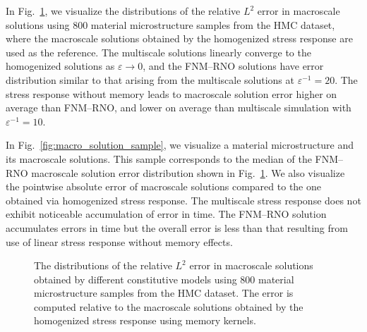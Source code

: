\documentclass[letterpaper,11pt]{article}
\begin{document}
    In Fig.~\ref{fig:macro_error}, we visualize the distributions of the relative $L^2$ error in macroscale solutions using 800 material microstructure samples from the HMC dataset, where the macroscale solutions obtained by the homogenized stress response are used as the reference. The multiscale solutions linearly converge to the homogenized solutions as $\varepsilon \to 0$, and the FNM--RNO solutions have  error distribution similar to that arising from the multiscale solutions at $\varepsilon^{-1}=20$. The stress response without memory leads to macroscale solution error higher on average than FNM--RNO, and lower on average than multiscale simulation with $\varepsilon^{-1}=10$. 
    
    In Fig.~\ref{fig:macro_solution_sample}, we visualize a material microstructure and its macroscale solutions. This sample corresponds to the median of the FNM--RNO macroscale solution error distribution shown in Fig.~\ref{fig:macro_error}. We also visualize the pointwise absolute error of macroscale solutions compared to the one obtained via homogenized stress response. The multiscale stress response does not exhibit noticeable accumulation of error in time. The FNM--RNO solution accumulates  errors in time but the overall error is less  than that resulting from use of linear stress response without memory effects.

    \begin{figure}[htbp]
    \centering
    \caption{The distributions of the relative $L^2$ error in macroscale solutions obtained by different constitutive models using 800 material microstructure samples from the HMC dataset. The error is computed relative to the macroscale solutions obtained by the homogenized stress response using memory kernels.}
    \label{fig:macro_error}
    \end{figure}
\end{document}
